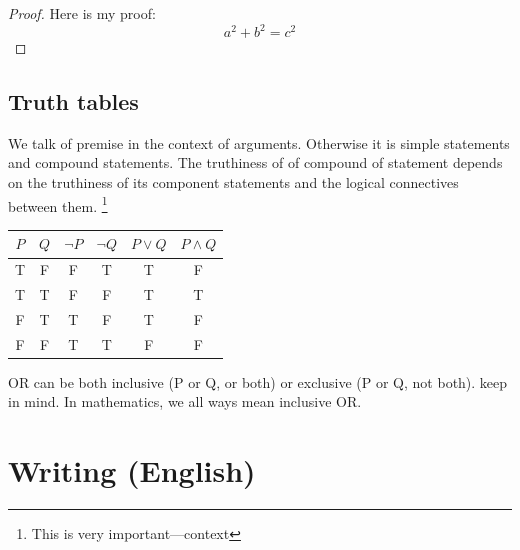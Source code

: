 \documentclass[a4paper]{article}
\begin{document}
\begin{proof}
    Here is my proof:
    \[
        a^2 + b^2 = c^2
    \]
\end{proof}

\subsection*{Truth tables}
We talk of premise in the context of arguments. Otherwise it is simple statements and compound statements. The truthiness of of compound of statement depends on 
the truthiness of its component statements and the logical connectives between them. \footnote{This is very important---context}

\begin{tabular}{ c c c c c c}
    \(P\) & \(Q\) & \(\lnot P\) & \(\lnot Q\) & \(P \lor Q\) & \(P \land Q\) \\
    \hline 
    T     & F     & F           & T           & T            & F             \\
    T     & T     & F           & F           & T            & T             \\
    F     & T     & T           & F           & T            & F             \\
    F     & F     & T           & T           & F            & F             \\
    \hline  
\end{tabular}

OR can be both inclusive (P or Q, or both) or exclusive (P or Q, not both). keep in mind. In mathematics, we all ways
mean inclusive OR.

\lstset{style=custom-java}

\section*{Writing (English)}
\end{document}
